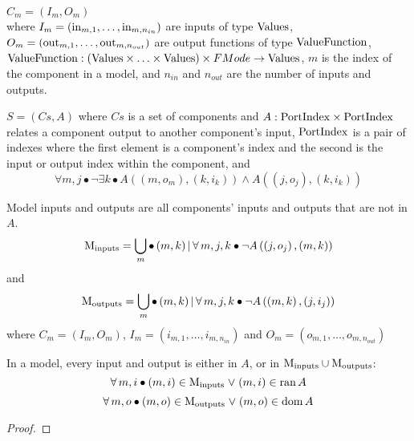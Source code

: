 \begin{definition}[Component]
\begin{sloppypar}
$C_m = \left(I_m, O_m \right)$
%
\\where $I_m = \left(\mathrm{in}_{m,1},\ldots,\mathrm{in}_{m,n_{in}}\right)$ are inputs of type $\mathrm{Values}$, $O_m = \left( \mathrm{out}_{m,1},\ldots,\mathrm{out}_{m,n_{out}} \right)$ are output functions of type $\mathrm{ValueFunction}$, $\mathrm{ValueFunction} : (\mathrm{Values} \times \ldots \times \mathrm{Values}) \times FMode \rightarrow \mathrm{Values} $, $m$ is the index of the component in a model, and $n_{in}$ and $n_{out}$ are the number of inputs and outputs.
\end{sloppypar}
\end{definition}

\begin{definition}
$S = \left(Cs, A\right)$
\noindent where $Cs$ is a set of components and $A : \mathrm{PortIndex} \times \mathrm{PortIndex}$ relates a component output to another component's input, $\mathrm{PortIndex}$ is a pair of indexes where the first element is a component's index and the second is the input or output index within the component, and
\[\forall m, j \bullet \lnot \exists k \bullet A\left(\left(m, o_m\right), \left(k, i_k\right)\right) \land A\left(\left(j, o_j\right), \left(k, i_k\right)\right)\]
\end{definition}

\begin{definition}
Model inputs and outputs are all components' inputs and outputs that are not in $A$.
\[
\MIn = \bigcup_m \bullet \left(m,k\right) | \forall m,j,k \bullet \lnot A\left( \left(j, o_j\right), \left(m, k\right) \right)
\]
and
\[
\MOut = \bigcup_m \bullet \left(m,k\right) | \forall m,j,k \bullet \lnot A\left( \left(m, k\right), \left(j, i_j\right) \right)
\]
%
where $C_m = \left(I_m, O_m\right)$, $I_m = \left(i_{m,1},\ldots,i_{m,n_{in}}\right)$ and $O_m = \left(o_{m,1},\ldots,o_{m,n_{out}}\right)$
\end{definition}

\begin{lemma}
In a model, every input and output is either in $A$, or in $\mathrm{M_{inputs}} \cup \mathrm{M_{outputs}}$:
\[\forall m,i \bullet \left(m,i\right) \in \MIn \lor \left(m,i\right) \in \ran A \]
\[\forall m,o \bullet \left(m,o\right) \in \MOut \lor \left(m,o\right) \in \dom A \]
\end{lemma}
\begin{proof}
\end{proof}


